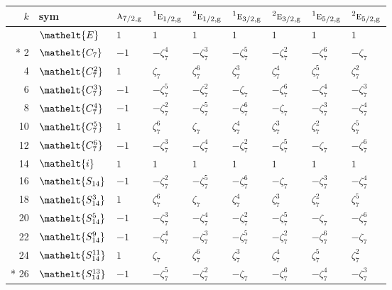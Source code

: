 \documentclass[10pt,a4paper]{article}
\numberwithin{equation}{section}
\newcommand{\eltfont}[1]{{\let\sigma\eltsigma\mathelt{#1}}}
\newcommand{\irr}[1]{\text{\normalfont\scshape #1}}
\newcommand{\conjpair}[1]{{}^{#1}}
\newcommand{\cls}[1]{\eltfont{#1}}
\newcommand{\ptag}[1]{\mathrm{#1}}
\newcommand{\rootunity}[1]{\zeta_{#1}}
\begin{document}
{\small\setlength{\tabcolsep}{4pt}
\begin{longtable}{@{}rllllllll@{}}\toprule
$k$ & sym & $\irr{a}_{7/2,\ptag{g}}$ & $\conjpair{1}\irr{e}_{1/2,\ptag{g}}$ & $\conjpair{2}\irr{e}_{1/2,\ptag{g}}$ & $\conjpair{1}\irr{e}_{3/2,\ptag{g}}$ & $\conjpair{2}\irr{e}_{3/2,\ptag{g}}$ & $\conjpair{1}\irr{e}_{5/2,\ptag{g}}$ & $\conjpair{2}\irr{e}_{5/2,\ptag{g}}$\\\midrule\endhead
\bottomrule\endfoot\endlastfoot
0 & $\cls{E}$ & $1$ & $1$ & $1$ & $1$ & $1$ & $1$ & $1$\\*
2 & $\cls{C_{7}}$ & $-1$ & $-\rootunity{7}^{4}$ & $-\rootunity{7}^{3}$ & $-\rootunity{7}^{5}$ & $-\rootunity{7}^{2}$ & $-\rootunity{7}^{6}$ & $-\rootunity{7}$\\
4 & $\cls{C_{7}^{2}}$ & $1$ & $\rootunity{7}$ & $\rootunity{7}^{6}$ & $\rootunity{7}^{3}$ & $\rootunity{7}^{4}$ & $\rootunity{7}^{5}$ & $\rootunity{7}^{2}$\\
6 & $\cls{C_{7}^{3}}$ & $-1$ & $-\rootunity{7}^{5}$ & $-\rootunity{7}^{2}$ & $-\rootunity{7}$ & $-\rootunity{7}^{6}$ & $-\rootunity{7}^{4}$ & $-\rootunity{7}^{3}$\\
8 & $\cls{C_{7}^{4}}$ & $-1$ & $-\rootunity{7}^{2}$ & $-\rootunity{7}^{5}$ & $-\rootunity{7}^{6}$ & $-\rootunity{7}$ & $-\rootunity{7}^{3}$ & $-\rootunity{7}^{4}$\\
10 & $\cls{C_{7}^{5}}$ & $1$ & $\rootunity{7}^{6}$ & $\rootunity{7}$ & $\rootunity{7}^{4}$ & $\rootunity{7}^{3}$ & $\rootunity{7}^{2}$ & $\rootunity{7}^{5}$\\
12 & $\cls{C_{7}^{6}}$ & $-1$ & $-\rootunity{7}^{3}$ & $-\rootunity{7}^{4}$ & $-\rootunity{7}^{2}$ & $-\rootunity{7}^{5}$ & $-\rootunity{7}$ & $-\rootunity{7}^{6}$\\
14 & $\cls{i}$ & $1$ & $1$ & $1$ & $1$ & $1$ & $1$ & $1$\\
16 & $\cls{S_{14}}$ & $-1$ & $-\rootunity{7}^{2}$ & $-\rootunity{7}^{5}$ & $-\rootunity{7}^{6}$ & $-\rootunity{7}$ & $-\rootunity{7}^{3}$ & $-\rootunity{7}^{4}$\\
18 & $\cls{S_{14}^{3}}$ & $1$ & $\rootunity{7}^{6}$ & $\rootunity{7}$ & $\rootunity{7}^{4}$ & $\rootunity{7}^{3}$ & $\rootunity{7}^{2}$ & $\rootunity{7}^{5}$\\
20 & $\cls{S_{14}^{5}}$ & $-1$ & $-\rootunity{7}^{3}$ & $-\rootunity{7}^{4}$ & $-\rootunity{7}^{2}$ & $-\rootunity{7}^{5}$ & $-\rootunity{7}$ & $-\rootunity{7}^{6}$\\
22 & $\cls{S_{14}^{9}}$ & $-1$ & $-\rootunity{7}^{4}$ & $-\rootunity{7}^{3}$ & $-\rootunity{7}^{5}$ & $-\rootunity{7}^{2}$ & $-\rootunity{7}^{6}$ & $-\rootunity{7}$\\
24 & $\cls{S_{14}^{11}}$ & $1$ & $\rootunity{7}$ & $\rootunity{7}^{6}$ & $\rootunity{7}^{3}$ & $\rootunity{7}^{4}$ & $\rootunity{7}^{5}$ & $\rootunity{7}^{2}$\\*
26 & $\cls{S_{14}^{13}}$ & $-1$ & $-\rootunity{7}^{5}$ & $-\rootunity{7}^{2}$ & $-\rootunity{7}$ & $-\rootunity{7}^{6}$ & $-\rootunity{7}^{4}$ & $-\rootunity{7}^{3}$\\
\bottomrule\end{longtable}}
\end{document}
